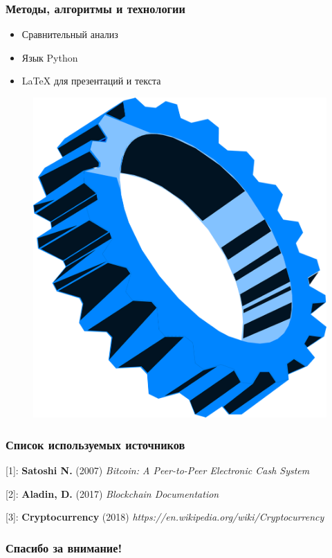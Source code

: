 \documentclass{beamer}
\begin{document}
\begin{frame}
    \frametitle{Методы, алгоритмы и технологии}
    \begin{multicols}{2}
        \begin{itemize}
            \item Сравнительный анализ
            \item Язык Python
            \item {\LaTeX} для презентаций и текста
        \end{itemize}
        \bigskip
        \columnbreak
        \begin{figure}
            \includegraphics[width=\columnwidth]{gear.png}
            \captionsetup{labelformat=empty}
        \end{figure}
    \end{multicols}
\end{frame}

\begin{frame}
    \frametitle{Список используемых источников}
    [1]: \textbf{Satoshi N.} (2007) \emph{Bitcoin: A Peer-to-Peer Electronic Cash System}

    [2]: \textbf{Aladin, D.} (2017) \emph{Blockchain Documentation}

    [3]: \textbf{Cryptocurrency} (2018)
    \emph{\small{https://en.wikipedia.org/wiki/Cryptocurrency}}
\end{frame}

\begin{frame}[c]
\begin{center}
\frametitle{\LARGE Спасибо за внимание!}

{\LARGE \inserttitle}

\bigskip

{\insertauthor}

\bigskip\bigskip

{\insertinstitute}

\bigskip\bigskip

{\large \insertdate}
\end{center}
\end{frame}
\end{document}
